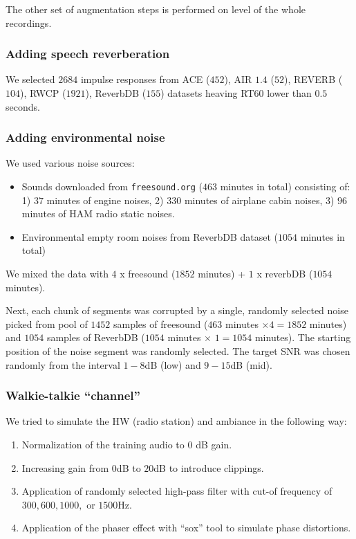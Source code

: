 \documentclass{article}
\begin{document}
The other set of augmentation steps is performed on level of the whole recordings.

\subsubsection{Adding speech reverberation}
We selected $2684$ impulse responses from ACE ($452$), AIR $1.4$
($52$), REVERB ($104$), RWCP ($1921$), ReverbDB ($155$) datasets
heaving RT$60$ lower than $0.5$ seconds. %

\subsubsection{Adding environmental noise}
We used various noise sources:
\begin{itemize}
    \item Sounds downloaded from \texttt{freesound.org} ($463$ minutes in total) consisting of: 1) $37$ minutes of engine noises, 2) $330$ minutes of airplane cabin noises, 3) $96$ minutes of HAM radio static noises.
    \item Environmental empty room noises from ReverbDB dataset ($1054$ minutes in total)
\end{itemize}

We mixed the data with $4$ x freesound ($1852$ minutes) + $1$ x
reverbDB ($1054$ minutes).

Next, each chunk of segments was corrupted by a single, randomly selected noise picked from pool of $1452$ samples of freesound ($463$ minutes $\times 4 = 1852$ minutes) and $1054$ samples of ReverbDB ($1054$ minutes $\times$ $1 = 1054$ minutes). %
The starting position of the noise segment was randomly selected. %
The target SNR was chosen randomly from the interval $1-8$dB (low) and $9-15$dB (mid).

\subsubsection{Walkie-talkie ``channel''}
We tried to simulate the HW (radio station) and ambiance in the following way:
\begin{enumerate}
  \item Normalization of the training audio to $0$ dB gain.
  \item Increasing gain from $0$dB to $20$dB to introduce clippings.
  \item Application of randomly selected high-pass filter with cut-of
    frequency of $300,600,1000,$ or $1500$Hz.
  \item Application of the phaser effect with ``sox'' tool to simulate phase distortions.
\end{enumerate}
\end{document}
